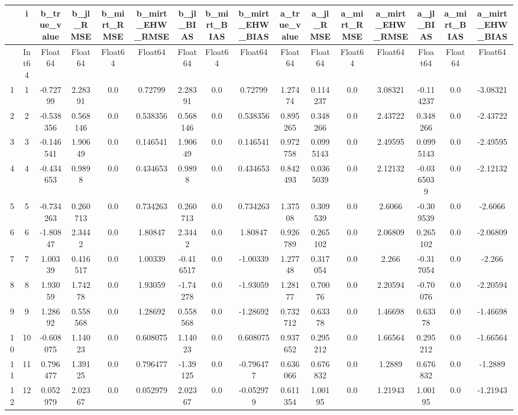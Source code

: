 \begin{tabular}{r|ccccccccccccccc}
	& i & b\_true\_value & b\_jl\_RMSE & b\_mirt\_RMSE & b\_mirt\_EHW\_RMSE & b\_jl\_BIAS & b\_mirt\_BIAS & b\_mirt\_EHW\_BIAS & a\_true\_value & a\_jl\_RMSE & a\_mirt\_RMSE & a\_mirt\_EHW\_RMSE & a\_jl\_BIAS & a\_mirt\_BIAS & a\_mirt\_EHW\_BIAS\\
	\hline
	& Int64 & Float64 & Float64 & Float64 & Float64 & Float64 & Float64 & Float64 & Float64 & Float64 & Float64 & Float64 & Float64 & Float64 & Float64\\
	\hline
	1 & 1 & -0.72799 & 2.28391 & 0.0 & 0.72799 & 2.28391 & 0.0 & 0.72799 & 1.27474 & 0.114237 & 0.0 & 3.08321 & -0.114237 & 0.0 & -3.08321 \\
	2 & 2 & -0.538356 & 0.568146 & 0.0 & 0.538356 & 0.568146 & 0.0 & 0.538356 & 0.895265 & 0.348266 & 0.0 & 2.43722 & 0.348266 & 0.0 & -2.43722 \\
	3 & 3 & -0.146541 & 1.90649 & 0.0 & 0.146541 & 1.90649 & 0.0 & 0.146541 & 0.972758 & 0.0995143 & 0.0 & 2.49595 & 0.0995143 & 0.0 & -2.49595 \\
	4 & 4 & -0.434653 & 0.9898 & 0.0 & 0.434653 & 0.9898 & 0.0 & 0.434653 & 0.842493 & 0.0365039 & 0.0 & 2.12132 & -0.0365039 & 0.0 & -2.12132 \\
	5 & 5 & -0.734263 & 0.260713 & 0.0 & 0.734263 & 0.260713 & 0.0 & 0.734263 & 1.37508 & 0.309539 & 0.0 & 2.6066 & -0.309539 & 0.0 & -2.6066 \\
	6 & 6 & -1.80847 & 2.3442 & 0.0 & 1.80847 & 2.3442 & 0.0 & 1.80847 & 0.926789 & 0.265102 & 0.0 & 2.06809 & 0.265102 & 0.0 & -2.06809 \\
	7 & 7 & 1.00339 & 0.416517 & 0.0 & 1.00339 & -0.416517 & 0.0 & -1.00339 & 1.27748 & 0.317054 & 0.0 & 2.266 & -0.317054 & 0.0 & -2.266 \\
	8 & 8 & 1.93059 & 1.74278 & 0.0 & 1.93059 & -1.74278 & 0.0 & -1.93059 & 1.28177 & 0.70076 & 0.0 & 2.20594 & -0.70076 & 0.0 & -2.20594 \\
	9 & 9 & 1.28692 & 0.558568 & 0.0 & 1.28692 & 0.558568 & 0.0 & -1.28692 & 0.732712 & 0.63378 & 0.0 & 1.46698 & 0.63378 & 0.0 & -1.46698 \\
	10 & 10 & -0.608075 & 1.14023 & 0.0 & 0.608075 & 1.14023 & 0.0 & 0.608075 & 0.937652 & 0.295212 & 0.0 & 1.66564 & 0.295212 & 0.0 & -1.66564 \\
	11 & 11 & 0.796477 & 1.39125 & 0.0 & 0.796477 & -1.39125 & 0.0 & -0.796477 & 0.636066 & 0.676832 & 0.0 & 1.2889 & 0.676832 & 0.0 & -1.2889 \\
	12 & 12 & 0.052979 & 2.02367 & 0.0 & 0.052979 & 2.02367 & 0.0 & -0.052979 & 0.611354 & 1.00195 & 0.0 & 1.21943 & 1.00195 & 0.0 & -1.21943 \\

\end{tabular}
